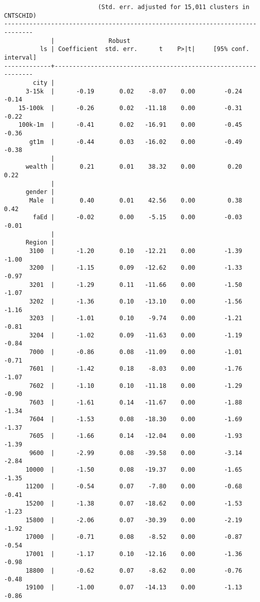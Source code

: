 \documentclass[10pt, letterpaper]{article}
\begin{document}
\begin{spacing}{1.4}
\begin{spacing}{.5}
\begin{scriptsize}
\begin{verbatim}
                          (Std. err. adjusted for 15,011 clusters in CNTSCHID)
------------------------------------------------------------------------------
             |               Robust
          ls | Coefficient  std. err.      t    P>|t|     [95% conf. interval]
-------------+----------------------------------------------------------------
        city |
      3-15k  |      -0.19       0.02    -8.07    0.00        -0.24       -0.14
    15-100k  |      -0.26       0.02   -11.18    0.00        -0.31       -0.22
    100k-1m  |      -0.41       0.02   -16.91    0.00        -0.45       -0.36
       gt1m  |      -0.44       0.03   -16.02    0.00        -0.49       -0.38
             |
      wealth |       0.21       0.01    38.32    0.00         0.20        0.22
             |
      gender |
       Male  |       0.40       0.01    42.56    0.00         0.38        0.42
        faEd |      -0.02       0.00    -5.15    0.00        -0.03       -0.01
             |
      Region |
       3100  |      -1.20       0.10   -12.21    0.00        -1.39       -1.00
       3200  |      -1.15       0.09   -12.62    0.00        -1.33       -0.97
       3201  |      -1.29       0.11   -11.66    0.00        -1.50       -1.07
       3202  |      -1.36       0.10   -13.10    0.00        -1.56       -1.16
       3203  |      -1.01       0.10    -9.74    0.00        -1.21       -0.81
       3204  |      -1.02       0.09   -11.63    0.00        -1.19       -0.84
       7000  |      -0.86       0.08   -11.09    0.00        -1.01       -0.71
       7601  |      -1.42       0.18    -8.03    0.00        -1.76       -1.07
       7602  |      -1.10       0.10   -11.18    0.00        -1.29       -0.90
       7603  |      -1.61       0.14   -11.67    0.00        -1.88       -1.34
       7604  |      -1.53       0.08   -18.30    0.00        -1.69       -1.37
       7605  |      -1.66       0.14   -12.04    0.00        -1.93       -1.39
       9600  |      -2.99       0.08   -39.58    0.00        -3.14       -2.84
      10000  |      -1.50       0.08   -19.37    0.00        -1.65       -1.35
      11200  |      -0.54       0.07    -7.80    0.00        -0.68       -0.41
      15200  |      -1.38       0.07   -18.62    0.00        -1.53       -1.23
      15800  |      -2.06       0.07   -30.39    0.00        -2.19       -1.92
      17000  |      -0.71       0.08    -8.52    0.00        -0.87       -0.54
      17001  |      -1.17       0.10   -12.16    0.00        -1.36       -0.98
      18800  |      -0.62       0.07    -8.62    0.00        -0.76       -0.48
      19100  |      -1.00       0.07   -14.13    0.00        -1.13       -0.86

\end{verbatim}
\end{scriptsize}
\end{spacing}
\end{spacing}
\end{document}
